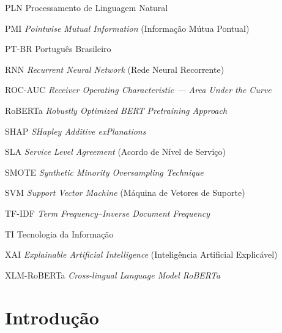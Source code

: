 \documentclass[
    12pt,                %
    openright,           %
    oneside,             %
    a4paper,             %
    english,             %
    brazil               %
]{abntex2}
\begin{document}
\begin{siglas}
  \item[PLN] Processamento de Linguagem Natural
  \item[PMI] \textit{Pointwise Mutual Information} (Informação Mútua Pontual)
  \item[PT-BR] Português Brasileiro
  \item[RNN] \textit{Recurrent Neural Network} (Rede Neural Recorrente)
  \item[ROC-AUC] \textit{Receiver Operating Characteristic — Area Under the Curve}
  \item[RoBERTa] \textit{Robustly Optimized BERT Pretraining Approach}
  \item[SHAP] \textit{SHapley Additive exPlanations}
  \item[SLA] \textit{Service Level Agreement} (Acordo de Nível de Serviço)
  \item[SMOTE] \textit{Synthetic Minority Oversampling Technique}
  \item[SVM] \textit{Support Vector Machine} (Máquina de Vetores de Suporte)
  \item[TF-IDF] \textit{Term Frequency–Inverse Document Frequency}
  \item[TI] Tecnologia da Informação
  \item[XAI] \textit{Explainable Artificial Intelligence} (Inteligência Artificial Explicável)
  \item[XLM-RoBERTa] \textit{Cross-lingual Language Model RoBERTa}
\end{siglas}

\tableofcontents*
\cleardoublepage

\textual

\chapter{Introdução}
\label{cap:introducao}
\end{document}
